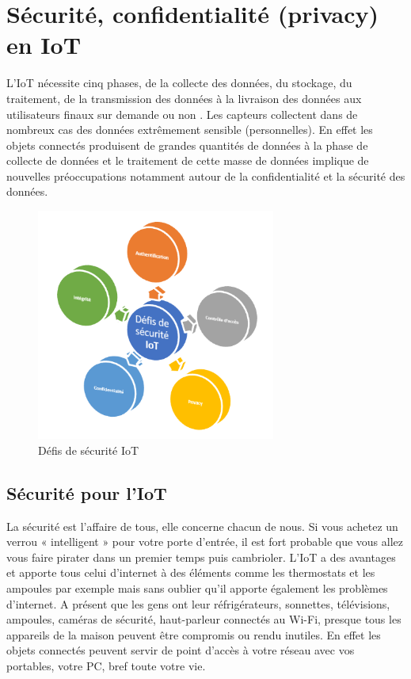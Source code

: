  \section{Sécurité, conf{\kern0pt}identialité (privacy) en IoT}
 L’IoT nécessite cinq phases, de la collecte des données, du stockage, du traitement, de la transmission des données à la livraison des données aux utilisateurs f{\kern0pt}inaux sur demande ou non \cite{hu2016security}. Les capteurs collectent dans de nombreux cas des données extrêmement sensible (personnelles). En ef{\kern0pt}fet les objets connectés produisent de grandes quantités de données à la phase de collecte de données et le traitement de cette masse de données implique de nouvelles préoccupations notamment autour de la conf{\kern0pt}identialité et la sécurité des données. 
\begin{figure}[H]
	\begin{center}
		\includegraphics[width=0.7\textwidth]{IMAGES/ORIGINALS/DsIoT}
	\end{center}
	\caption{Déf{\kern0pt}is de sécurité IoT}
\end{figure}

\subsection{Sécurité pour l’IoT}
La sécurité est l’af{\kern0pt}faire de tous, elle concerne chacun de nous. Si vous achetez un verrou « intelligent » pour votre porte d’entrée, il est fort probable que vous allez vous faire pirater dans un premier temps puis cambrioler. L’IoT a des avantages et apporte tous celui d’internet à des éléments comme les thermostats et les ampoules par exemple mais sans oublier qu’il apporte également les problèmes d’internet. A présent que les gens ont leur réfrigérateurs, sonnettes, télévisions, ampoules, caméras de sécurité, haut-parleur connectés au Wi-Fi, presque tous les appareils de la maison peuvent être compromis ou rendu inutiles. En ef{\kern0pt}fet les objets connectés peuvent servir de point d’accès à votre réseau avec vos portables, votre PC, bref toute votre vie.



